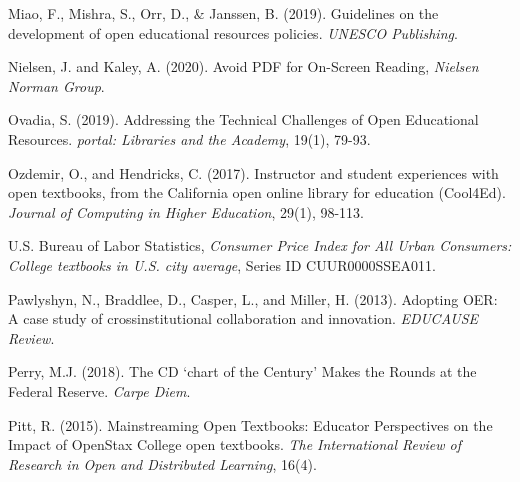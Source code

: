 \documentclass[11pt]{article}
\newcommand{\alink}[2]{\href{#1}{\textcolor{blue}{#2}}}
\begin{document}
\begin{thebibliography}{99}
   Miao, F., Mishra, S., Orr, D., \& Janssen, B. (2019). Guidelines on the development of open educational resources policies. {\em UNESCO Publishing}.%

   Nielsen, J. and Kaley, A. (2020).  Avoid PDF for On-Screen Reading, {\em Nielsen Norman Group}.%
  
   Ovadia, S. (2019). Addressing the Technical Challenges of Open Educational Resources.  {\em portal: Libraries and the Academy}, 19(1), 79-93.%

   Ozdemir, O., and Hendricks, C. (2017). Instructor and student experiences with open textbooks, from the California open online library for education (Cool4Ed). {\em Journal of Computing in Higher Education}, 29(1), 98-113.

   U.S. Bureau of Labor Statistics, {\em Consumer Price Index for All Urban Consumers: College textbooks in U.S. city average}, Series ID CUUR0000SSEA011.%

   Pawlyshyn, N., Braddlee, D., Casper, L., and Miller, H. (2013). Adopting OER: A case study of crossinstitutional collaboration and innovation. {\em EDUCAUSE Review}.

   Perry, M.J. (2018). The CD `chart of the Century' Makes the Rounds at the Federal Reserve. {\em Carpe Diem}.%


   Pitt, R. (2015). Mainstreaming Open Textbooks: Educator Perspectives on the Impact of OpenStax College open textbooks. {\em The International Review of Research in Open and Distributed Learning}, 16(4).


\end{thebibliography}
\end{document}
